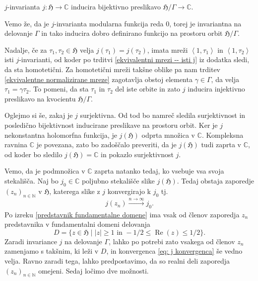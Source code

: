 \documentclass[mat1]{fmfdelo}
\numberwithin{equation}{section}
\newcommand{\N}{\mathbb N}
\newcommand{\C}{\mathbb C}
\newcommand{\HH}{\mathfrak{H}}
\newcommand{\SL}{\Gamma}
\newcommand{\abs}[1]{\left\lvert #1 \right\rvert}
\newcommand{\lattice}[2]{\left\langle #1, #2 \right\rangle}
\renewcommand\Re{\operatorname{Re}}%
\newcommand{\tj}{tj.\ }
\theoremstyle{definition}
\begin{document}


\begin{izrek}
    \label{bijektivnost j-invariante}
    $j$-invarianta $j : \HH \to \C$ inducira bijektivno preslikavo $\HH/\SL \to \C $.
\end{izrek}
    
\begin{dokaz}
    Vemo že, da je $j$-invarianta modularna funkcija reda $0$, torej je invariantna na delovanje $\SL$ in tako inducira dobro definirano funkcijo na prostoru orbit $\HH/\SL$. 
    
    Nadalje, če za $\tau_1, \tau_2 \in \HH$ velja $j(\tau_1) = j(\tau_2)$, imata mreži $\lattice{1}{\tau_1}$ in $\lattice{1}{\tau_2}$ isti $j$-invarianti, od koder po trditvi \ref{ekvivalentni mrezi -- isti j} iz dodatka sledi, da sta homotetični. Za homotetični mreži takšne oblike pa nam trditev \ref{ekvivalentne normalizirane mreze} zagotavlja obstoj elementa $\gamma \in \SL$, da velja $\tau_1 = \gamma \tau_2$. To pomeni, da sta $\tau_1$ in $\tau_2$ del iste orbite in zato $j$ inducira injektivno preslikavo na kvocientu $\HH/\SL$.

    Oglejmo si še, zakaj je $j$ surjektivna. Od tod bo namreč sledila surjektivnost in posledično bijektivnost inducirane preslikave na prostoru orbit. Ker je $j$ nekonstantna holomorfna funkcija, je $j(\HH)$ odprta množica v $\C$. Kompleksna ravnina $\C$ je povezana, zato bo zadoščalo preveriti, da je $j(\HH)$ tudi zaprta v $\C$, od koder bo sledilo $j(\HH) = \C$ in pokazlo surjektivnost $j$. 

    Vemo, da je podmnožica v $\C$ zaprta natanko tedaj, ko vsebuje vsa svoja stekališča. Naj bo $j_0 \in \C$ poljubno stekališče slike $j(\HH)$. Tedaj obstaja zaporedje $(z_n)_{n\in \N}$ v $\HH$, katerega slike z $j$ konvergirajo k $j_0$ \tj 
    \begin{equation}
        \label{eq: j konvergenca}
        j(z_n) \xrightarrow[]{n \to \infty} j_0. 
    \end{equation}
    Po izreku \ref{predstavnik fundamentalne domene} ima vsak od členov zaporedja $z_n$ predstavnika v fundamentalni domeni delovanja 
    \[
        D = \{z \in \HH \mid \abs{z} \geq 1 \text{ in } -1/2\leq \Re(z) \leq 1/2\}. 
    \]
    Zaradi invariance $j$ na delovanje $\SL$, lahko po potrebi zato vsakega od členov $z_n$ zamenjamo s takšnim, ki leži v $D$, in konvergenca \eqref{eq: j konvergenca} še vedno velja. 
    Ravno zaradi tega, lahko predpostavimo, da so realni deli zaporedja $(z_n)_{n\in \N}$ omejeni. Sedaj ločimo dve možnosti.


\end{dokaz}
\end{document}
